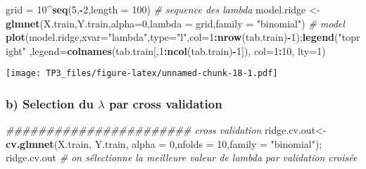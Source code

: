 \documentclass[
]{article}
\newenvironment{Shaded}{\begin{snugshade}}{\end{snugshade}}
\newcommand{\CommentTok}[1]{\textcolor[rgb]{0.56,0.35,0.01}{\textit{#1}}}
\newcommand{\DataTypeTok}[1]{\textcolor[rgb]{0.13,0.29,0.53}{#1}}
\newcommand{\DecValTok}[1]{\textcolor[rgb]{0.00,0.00,0.81}{#1}}
\newcommand{\KeywordTok}[1]{\textcolor[rgb]{0.13,0.29,0.53}{\textbf{#1}}}
\newcommand{\NormalTok}[1]{#1}
\newcommand{\OperatorTok}[1]{\textcolor[rgb]{0.81,0.36,0.00}{\textbf{#1}}}
\newcommand{\StringTok}[1]{\textcolor[rgb]{0.31,0.60,0.02}{#1}}
\begin{document}
\begin{Shaded}
\begin{Highlighting}[]
\NormalTok{grid =}\StringTok{ }\DecValTok{10}\OperatorTok{^}\KeywordTok{seq}\NormalTok{(}\DecValTok{5}\NormalTok{,}\OperatorTok{-}\DecValTok{2}\NormalTok{,}\DataTypeTok{length =} \DecValTok{100}\NormalTok{) }\CommentTok{# sequence des lambda}
\NormalTok{model.ridge <-}\StringTok{ }\KeywordTok{glmnet}\NormalTok{(X.train,Y.train,}\DataTypeTok{alpha=}\DecValTok{0}\NormalTok{,}\DataTypeTok{lambda =}\NormalTok{ grid,}\DataTypeTok{family =} \StringTok{"binomial"}\NormalTok{) }\CommentTok{# model}
\KeywordTok{plot}\NormalTok{(model.ridge,}\DataTypeTok{xvar=}\StringTok{"lambda"}\NormalTok{,}\DataTypeTok{type=}\StringTok{"l"}\NormalTok{,}\DataTypeTok{col=}\DecValTok{1}\OperatorTok{:}\KeywordTok{nrow}\NormalTok{(tab.train)}\OperatorTok{-}\DecValTok{1}\NormalTok{);}\KeywordTok{legend}\NormalTok{(}\StringTok{"topright"}\NormalTok{                                                            ,}\DataTypeTok{legend=}\KeywordTok{colnames}\NormalTok{(tab.train[,}\DecValTok{1}\OperatorTok{:}\KeywordTok{ncol}\NormalTok{(tab.train)}\OperatorTok{-}\DecValTok{1}\NormalTok{]), }\DataTypeTok{col=}\DecValTok{1}\OperatorTok{:}\DecValTok{10}\NormalTok{, }\DataTypeTok{lty=}\DecValTok{1}\NormalTok{)}
\end{Highlighting}
\end{Shaded}

\texttt{[image: TP3\_files/figure-latex/unnamed-chunk-18-1.pdf]}

\hypertarget{b-selection-du-lambda-par-cross-validation}{%
\subsubsection{\texorpdfstring{b) Selection du \(\lambda\) par cross
validation}{b) Selection du \textbackslash lambda par cross validation}}\label{b-selection-du-lambda-par-cross-validation}}

\begin{Shaded}
\begin{Highlighting}[]
\CommentTok{####################### cross validation}
\NormalTok{ridge.cv.out<-}\KeywordTok{cv.glmnet}\NormalTok{(X.train, Y.train, }\DataTypeTok{alpha =} \DecValTok{0}\NormalTok{,}\DataTypeTok{nfolds =} \DecValTok{10}\NormalTok{,}\DataTypeTok{family =} \StringTok{"binomial"}\NormalTok{); ridge.cv.out }\CommentTok{# on sélectionne la meilleure valeur de lambda par validation croisée}
\end{Highlighting}
\end{Shaded}
\end{document}
